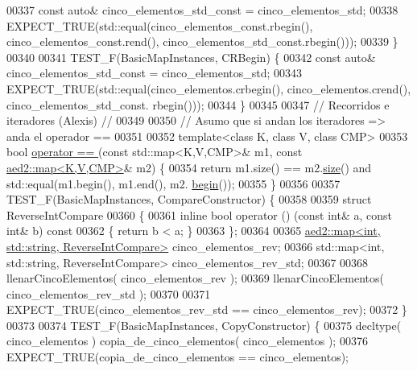 \begin{DoxyCode}
00337     \textcolor{keyword}{const} \textcolor{keyword}{auto}& cinco\_elementos\_std\_const = cinco\_elementos\_std;
00338     EXPECT\_TRUE(std::equal(cinco\_elementos\_const.rbegin(), cinco\_elementos\_const.rend(), 
      cinco\_elementos\_std\_const.rbegin()));
00339 \}
00340 
00341 TEST\_F(BasicMapInstances, CRBegin) \{
00342     \textcolor{keyword}{const} \textcolor{keyword}{auto}& cinco\_elementos\_std\_const = cinco\_elementos\_std;
00343     EXPECT\_TRUE(std::equal(cinco\_elementos.crbegin(), cinco\_elementos.crend(), cinco\_elementos\_std\_const.
      rbegin()));
00344 \}
00345 
00347 \textcolor{comment}{// Recorridos e iteradores (Alexis) //}
00349 \textcolor{comment}{}
00350 \textcolor{comment}{// Asumo que si andan los iteradores => anda el operador ==}
00351 
00352 \textcolor{keyword}{template}<\textcolor{keyword}{class} K, \textcolor{keyword}{class} V, \textcolor{keyword}{class} CMP>
00353 \textcolor{keywordtype}{bool} \hyperlink{classaed2_1_1map_abfc51b39670220e79037ac067006e933_abfc51b39670220e79037ac067006e933}{operator == }(\textcolor{keyword}{const} std::map<K,V,CMP>& m1, \textcolor{keyword}{const} 
      \hyperlink{classaed2_1_1map}{aed2::map<K,V,CMP>}& m2) \{
00354     \textcolor{keywordflow}{return} m1.size() == m2.\hyperlink{classaed2_1_1map_a89f2613f926ac13293eafe65889d6021_a89f2613f926ac13293eafe65889d6021}{size}() and std::equal(m1.begin(), m1.end(), m2.
      \hyperlink{classaed2_1_1map_a58a95705d54b3dda7f775ce5a22225cb_a58a95705d54b3dda7f775ce5a22225cb}{begin}());
00355 \}
00356 
00357 TEST\_F(BasicMapInstances, CompareConstructor) \{
00358 
00359     \textcolor{keyword}{struct }ReverseIntCompare
00360     \{
00361         \textcolor{keyword}{inline} \textcolor{keywordtype}{bool} operator () (\textcolor{keyword}{const} \textcolor{keywordtype}{int}& a, \textcolor{keyword}{const} \textcolor{keywordtype}{int}& b)\textcolor{keyword}{ const}
00362 \textcolor{keyword}{        }\{ \textcolor{keywordflow}{return} b < a; \}
00363     \};
00364 
00365     \hyperlink{classaed2_1_1map}{aed2::map<int, std::string, ReverseIntCompare>} 
      cinco\_elementos\_rev;
00366     std::map<int, std::string, ReverseIntCompare> cinco\_elementos\_rev\_std;
00367 
00368     llenarCincoElementos( cinco\_elementos\_rev );
00369     llenarCincoElementos( cinco\_elementos\_rev\_std );
00370 
00371     EXPECT\_TRUE(cinco\_elementos\_rev\_std == cinco\_elementos\_rev);
00372 \}
00373 
00374 TEST\_F(BasicMapInstances, CopyConstructor) \{
00375     decltype( cinco\_elementos ) copia\_de\_cinco\_elementos( cinco\_elementos );
00376     EXPECT\_TRUE(copia\_de\_cinco\_elementos == cinco\_elementos);

\end{DoxyCode}
